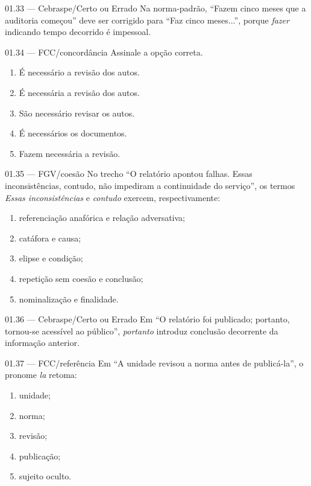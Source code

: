 \begin{questao}{ 01.33 — Cebraspe/Certo ou Errado}
Na norma-padrão, ``Fazem cinco meses que a auditoria começou'' deve ser corrigido para ``Faz cinco meses...'', porque \emph{fazer} indicando tempo decorrido é impessoal.
\end{questao}

\begin{questao}{ 01.34 — FCC/concordância}
Assinale a opção correta.
\begin{enumerate}[label=\Alph*)]
\item É necessário a revisão dos autos.
\item É necessária a revisão dos autos.
\item São necessário revisar os autos.
\item É necessários os documentos.
\item Fazem necessária a revisão.
\end{enumerate}
\end{questao}

\begin{questao}{ 01.35 — FGV/coesão}
No trecho ``O relatório apontou falhas. Essas inconsistências, contudo, não impediram a continuidade do serviço'', os termos \emph{Essas inconsistências} e \emph{contudo} exercem, respectivamente:
\begin{enumerate}[label=\Alph*)]
\item referenciação anafórica e relação adversativa;
\item catáfora e causa;
\item elipse e condição;
\item repetição sem coesão e conclusão;
\item nominalização e finalidade.
\end{enumerate}
\end{questao}

\begin{questao}{ 01.36 — Cebraspe/Certo ou Errado}
Em ``O relatório foi publicado; portanto, tornou-se acessível ao público'', \emph{portanto} introduz conclusão decorrente da informação anterior.
\end{questao}

\begin{questao}{ 01.37 — FCC/referência}
Em ``A unidade revisou a norma antes de publicá-la'', o pronome \emph{la} retoma:
\begin{enumerate}[label=\Alph*)]
\item unidade;
\item norma;
\item revisão;
\item publicação;
\item sujeito oculto.
\end{enumerate}
\end{questao}

